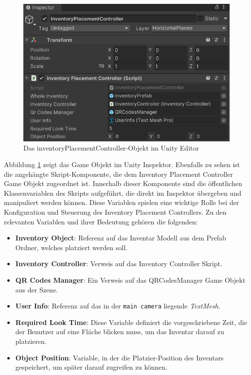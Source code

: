 \begin{figure}[H]
    \centering
    \includegraphics[scale=0.8]{images/invPlace_Editor}
    \caption{Das inventoryPlacementController-Objekt im Unity Editor}
    \label{fig:inventoryPlacementController_Editor}
\end{figure}

Abbildung \ref{fig:inventoryPlacementController_Editor} zeigt das Game Objekt im Unity Inspektor. Ebenfalls zu sehen ist
die angehängte Skript-Komponente, die dem Inventory Placement Controller Game Objekt zugeordnet ist. Innerhalb dieser
Komponente sind die öffentlichen Klassenvariablen des Skripts aufgeführt, die direkt im Inspektor übergeben und manipuliert
werden können. Diese Variablen spielen eine wichtige Rolle bei der Konfiguration und Steuerung des Inventory Placement
Controllers. Zu den relevanten Variablen und ihrer Bedeutung gehören die folgenden:

\begin{itemize}
    \item \textbf{Inventory Object}: Referenz auf das Inventar Modell aus dem Prefab Ordner, welches platziert werden soll.

    \item \textbf{Inventory Controller}: Verweis auf das Inventory Controller Skript.

    \item \textbf{QR Codes Manager}: Ein Verweis auf das QRCodesManager Game Objekt aus der Szene.

    \item \textbf{User Info}: Referenz auf das in der \texttt{main camera} liegende \textit{TextMesh}.

    \item \textbf{Required Look Time}: Diese Variable definiert die vorgeschriebene Zeit, die der Benutzer auf eine Fläche
    blicken muss, um das Inventar darauf zu platzieren.

    \item \textbf{Object Position}: Variable, in der die Platzier-Position des Inventars gespeichert, um später darauf
    zugreifen zu können.
\end{itemize}

